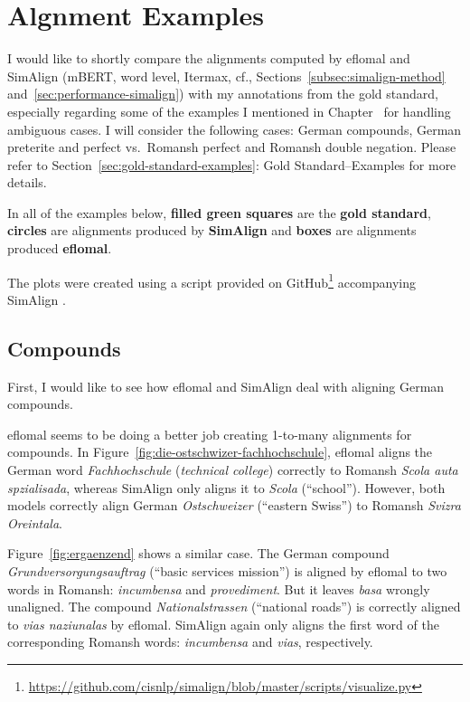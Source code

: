 \chapter{Algnment Examples}\label{appendix-a}

I would like to shortly compare the  alignments computed by eflomal and SimAlign (mBERT, word level, Itermax, cf., Sections~\ref{subsec:simalign-method} and~\ref{sec:performance-simalign}) with my annotations from the gold standard, especially regarding some of the examples I mentioned in Chapter~ for handling ambiguous cases.
I will consider the following cases: German compounds,  German preterite and perfect vs.~Romansh perfect and Romansh double negation. 
Please refer to Section~\ref{sec:gold-standard-examples}: Gold Standard--Examples for more details.

In all of the examples below, \textbf{filled green squares} are the \textbf{gold standard},\textbf{ circles} are alignments produced by \textbf{SimAlign} and \textbf{boxes} are alignments produced \textbf{eflomal}. 

The plots were created using a script provided on GitHub\footnote{\url{https://github.com/cisnlp/simalign/blob/master/scripts/visualize.py}} accompanying SimAlign \autocite{jalili-sabet-etal-2020-simalign}.

\section{Compounds}
First, I would like to see how eflomal and SimAlign deal with aligning German compounds.

eflomal seems to be doing a better job creating 1-to-many alignments for compounds. 
In Figure~\ref{fig:die-ostschwizer-fachhochschule}, eflomal aligns  the German word \emph{Fachhochschule} (\emph{technical college}) correctly  to Romansh \emph{Scola auta spzialisada}, whereas SimAlign only aligns it to \emph{Scola} (\enquote{school}). 
However, both models correctly align German \emph{Ostschweizer} (\enquote{eastern Swiss}) to Romansh \emph{Svizra Oreintala}.

Figure~\ref{fig:ergaenzend} shows a similar case. The German compound \emph{Grundversorgungsauftrag} (\enquote{basic services mission}) is aligned by eflomal to two words in Romansh: \emph{incumbensa} and \emph{provediment}. But it leaves \emph{basa} wrongly unaligned. 
The compound \emph{Nationalstrassen} (\enquote{national roads}) is correctly aligned to \emph{vias naziunalas} by eflomal. SimAlign again only aligns the first word of the corresponding Romansh words: \emph{incumbensa}  and \emph{vias}, respectively.

